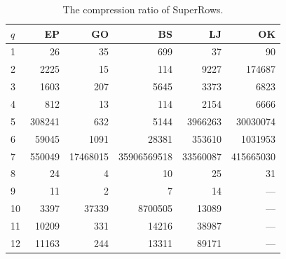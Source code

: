 \begin{table}
  \caption{The compression ratio of SuperRows.}\label{tab:compression_ratio}
  \begin{tabular}{lrrrrr}
    \toprule
    $q$ &     EP &       GO &          BS &       LJ &        OK \\
    \midrule
    1  &     26 &       35 &         699 &       37 &        90 \\
    2  &   2225 &       15 &         114 &     9227 &    174687 \\
    3  &   1603 &      207 &        5645 &     3373 &      6823 \\
    4  &    812 &       13 &         114 &     2154 &      6666 \\
    5  & 308241 &      632 &        5144 &  3966263 &  30030074 \\
    6  &  59045 &     1091 &       28381 &   353610 &   1031953 \\
    7  & 550049 & 17468015 & 35906569518 & 33560087 & 415665030 \\
    8  &     24 &        4 &          10 &       25 &        31 \\
    9  &     11 &        2 &           7 &       14 &      ---  \\
    10 &   3397 &    37339 &     8700505 &    13089 &      ---  \\
    11 &  10209 &      331 &       14216 &    38987 &      ---  \\
    12 &  11163 &      244 &       13311 &    89171 &      ---  \\
    \bottomrule
  \end{tabular}
\end{table}


